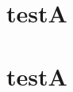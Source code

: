 \documentclass{article}
\newcommand{\testA}{testA}
\begin{document}
\tableofcontents

\section{\testA}          %
\section{\protect\testA}  %
\section{\testB}          %
\section{\testC}          %
\end{document}

